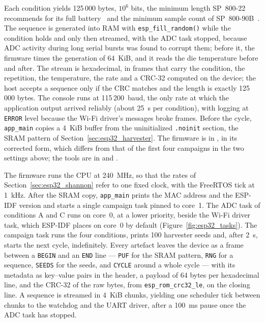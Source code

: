 Each condition yields 125\,000 bytes, $10^6$ bits, the minimum length
SP~800-22 recommends for its full battery~\cite{bassham_2010_sp80022} and
the minimum sample count of SP~800-90B~\cite{turan_2018_sp80090b}. The
sequence is generated into RAM with \texttt{esp\_fill\_random()} while
the condition holds and only then streamed, with the ADC task stopped,
because ADC activity during long serial bursts was found to corrupt them;
before it, the firmware times the generation of 64~KiB, and it reads the
die temperature before and after. The stream is hexadecimal, in frames
that carry the condition, the repetition, the temperature, the rate and a
CRC-32 computed on the device; the host accepts a sequence only if the
CRC matches and the length is exactly 125\,000 bytes. The console runs at
115\,200~baud, the only rate at which the application output arrived
reliably (about 25~s per condition), with logging at \texttt{ERROR} level
because the Wi-Fi driver's messages broke frames. Before the cycle,
\texttt{app\_main} copies a 4~KiB buffer from the uninitialized
\texttt{.noinit} section, the SRAM pattern of
Section~\ref{sec:esp32_harvester}. The firmware is in
, in its corrected form, which differs from
that of the first four campaigns in the two settings above; the tools are in  and
.

The firmware runs the CPU at 240~MHz, so that the rates of
Section~\ref{sec:esp32_shannon} refer to one fixed clock, with the
FreeRTOS tick at 1~kHz. After the SRAM copy, \texttt{app\_main} prints
the MAC address and the ESP-IDF version and starts a single campaign task
pinned to core~1. The ADC task of conditions A and C runs on core~0, at a
lower priority, beside the Wi-Fi driver task, which ESP-IDF places on
core~0 by default (Figure~\ref{fig:esp32_tasks}). The campaign task runs
the four conditions, prints 100 harvester seeds and, after 2~s, starts
the next cycle, indefinitely. Every artefact leaves the device as a frame
between a \texttt{BEGIN} and an \texttt{END} line --- \texttt{PUF} for the
SRAM pattern, \texttt{RNG} for a sequence, \texttt{SEEDS} for the seeds,
and \texttt{CYCLE} around a whole cycle --- with its metadata as
key--value pairs in the header, a payload of 64 bytes per hexadecimal
line, and the CRC-32 of the raw bytes, from \texttt{esp\_rom\_crc32\_le},
on the closing line. A sequence is streamed in 4~KiB chunks, yielding one
scheduler tick between chunks to the watchdog and the UART driver, after
a 100~ms pause once the ADC task has stopped.

